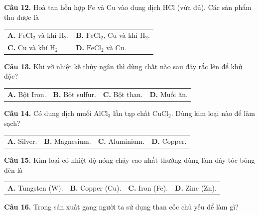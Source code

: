 \documentclass{article}
\begin{document}
\vspace*{\fill}

\textbf{Câu 12.} Hoà tan hỗn hợp $\text{Fe}$ và $\text{Cu}$ vào dung dịch $\text{HCl}$ (vừa đủ). Các sản phẩm thu được là
\vspace{6pt}

\begin{tabularx}{\linewidth}{@{}X X@{}}
\textbf{A.} $\text{FeCl}_2$ và khí $\text{H}_2$. & \textbf{B.} $\text{FeCl}_2$, $\text{Cu}$ và khí $\text{H}_2$.\\[8pt]
\textbf{C.} $\text{Cu}$ và khí $\text{H}_2$. & \textbf{D.} $\text{FeCl}_2$ và $\text{Cu}$.
\end{tabularx}
\vspace*{\fill}
\newpage

\fontsize{28}{36}\selectfont
\textbf{Câu 13.} Khi vỡ nhiệt kế thủy ngân thì dùng chất nào sau đây rắc lên để khử độc?
\vspace{6pt}

\begin{tabularx}{\linewidth}{@{}X X X X@{}}
\textbf{A.} Bột Iron. & \textbf{B.} Bột sulfur. & \textbf{C.} Bột than. & \textbf{D.} Muối ăn.
\end{tabularx}

\vspace*{\fill}

\textbf{Câu 14.} Có dung dịch muối $\text{AlCl}_3$ lẫn tạp chất $\text{CuCl}_2$. Dùng kim loại nào để làm sạch?
\vspace{6pt}

\begin{tabularx}{\linewidth}{@{}X X X X@{}}
\textbf{A.} Silver. & \textbf{B.} Magnesium. & \textbf{C.} Aluminium. & \textbf{D.} Copper.
\end{tabularx}
\vspace*{\fill}
\newpage

\fontsize{28}{36}\selectfont
\textbf{Câu 15.} Kim loại có nhiệt độ nóng chảy cao nhất thường dùng làm dây tóc bóng đèn là
\vspace{6pt}

\begin{tabularx}{\linewidth}{@{}X X X X@{}}
\textbf{A.} Tungsten (W). & \textbf{B.} Copper (Cu). & \textbf{C.} Iron (Fe). & \textbf{D.} Zinc (Zn).
\end{tabularx}

\vspace*{\fill}

\textbf{Câu 16.} Trong sản xuất gang người ta sử dụng than cốc chủ yếu để làm gì?
\vspace{6pt}
\end{document}
